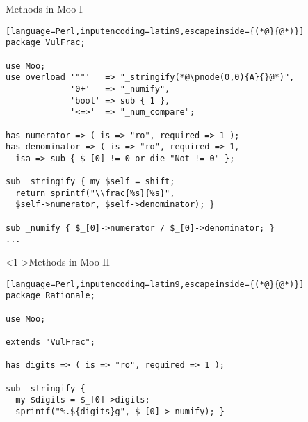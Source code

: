 \documentclass[ngerman,xcolor={table,dvipsnames},smaller,compress,hyperref={bookmarks,colorlinks}]{beamer}
\begin{document}
\begin{frame}[t,fragile]

\begin{block}{Methods in Moo I}
\scriptsize
\begin{lstlisting}[language=Perl,inputencoding=latin9,escapeinside={(*@}{@*)}]
package VulFrac;

use Moo;
use overload '""'   => "_stringify(*@\pnode(0,0){A}{}@*)",
             '0+'   => "_numify",
             'bool' => sub { 1 },
             '<=>'  => "_num_compare";

has numerator => ( is => "ro", required => 1 );
has denominator => ( is => "ro", required => 1,
  isa => sub { $_[0] != 0 or die "Not != 0" };

sub _stringify { my $self = shift;
  return sprintf("\\frac{%s}{%s}",
  $self->numerator, $self->denominator); }

sub _numify { $_[0]->numerator / $_[0]->denominator; }
...
\end{lstlisting}
\end{block}


\end{frame}

\begin{frame}[t,fragile]

\begin{block}<1->{Methods in Moo II}
\scriptsize
\begin{lstlisting}[language=Perl,inputencoding=latin9,escapeinside={(*@}{@*)}]
package Rationale;

use Moo;

extends "VulFrac";

has digits => ( is => "ro", required => 1 );

sub _stringify {
  my $digits = $_[0]->digits;
  sprintf("%.${digits}g", $_[0]->_numify); }

\end{lstlisting}
\end{block}


\end{frame}
\end{document}
